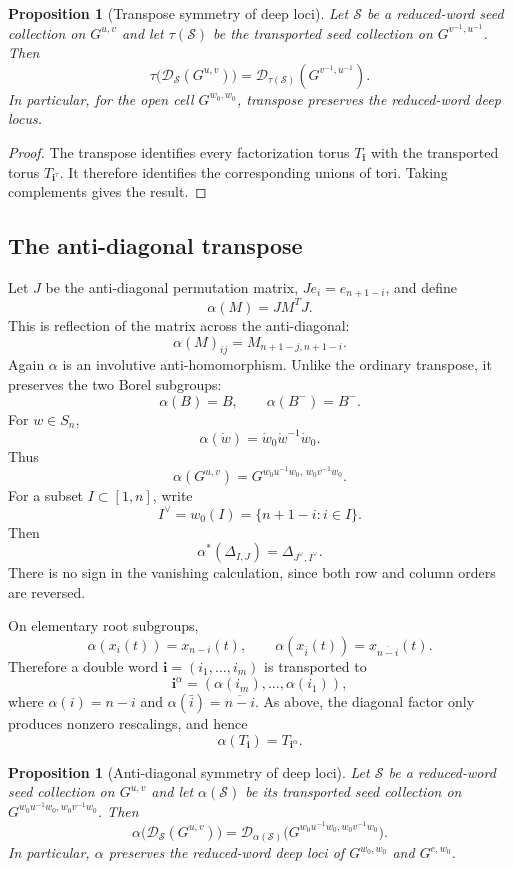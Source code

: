 \documentclass[12pt]{amsart}
\newcommand{\bi}{\mathbf i}
\newcommand{\cS}{\mathcal S}
\newcommand{\cD}{\mathcal D}
\theoremstyle{plain}
\newtheorem{proposition}[theorem]{Proposition}
\theoremstyle{definition}
\theoremstyle{remark}
\begin{document}
\begin{proposition}[Transpose symmetry of deep loci]\label{prop:transpose_symmetry}
Let $\cS$ be a reduced-word seed collection on $G^{u,v}$ and let $\tau(\cS)$ be the transported seed collection on $G^{v^{-1},u^{-1}}$.  Then
\[
   \tau\bigl(\cD_{\cS}(G^{u,v})\bigr)
   =\cD_{\tau(\cS)}(G^{v^{-1},u^{-1}}).
\]
In particular, for the open cell $G^{w_0,w_0}$, transpose preserves the reduced-word deep locus.
\end{proposition}

\begin{proof}
The transpose identifies every factorization torus $T_{\bi}$ with the transported torus $T_{\bi^\tau}$.  It therefore identifies the corresponding unions of tori.  Taking complements gives the result.
\end{proof}

\subsection{The anti-diagonal transpose}

Let $J$ be the anti-diagonal permutation matrix, $Je_i=e_{n+1-i}$, and define
\[
   \alpha(M)=J M^T J.
\]
This is reflection of the matrix across the anti-diagonal:
\[
   \alpha(M)_{ij}=M_{n+1-j,n+1-i}.
\]
Again $\alpha$ is an involutive anti-homomorphism.  Unlike the ordinary transpose, it preserves the two Borel subgroups:
\[
   \alpha(B)=B,
   \qquad
   \alpha(B^-)=B^-.
\]
For $w\in S_n$,
\[
   \alpha(\dot w)=\dot w_0\dot w^{-1}\dot w_0.
\]
Thus
\[
   \alpha(G^{u,v})
   =G^{w_0u^{-1}w_0,\,w_0v^{-1}w_0}.
\]
For a subset $I\subset[1,n]$, write
\[
   I^\vee=w_0(I)=\{n+1-i:i\in I\}.
\]
Then
\[
   \alpha^*(\Delta_{I,J})=\Delta_{J^\vee,I^\vee}.
\]
There is no sign in the vanishing calculation, since both row and column orders are reversed.

On elementary root subgroups,
\[
   \alpha(x_i(t))=x_{n-i}(t),
   \qquad
   \alpha(x_{\bar i}(t))=x_{\overline{n-i}}(t).
\]
Therefore a double word $\bi=(i_1,\ldots,i_m)$ is transported to
\[
   \bi^\alpha=(\alpha(i_m),\ldots,\alpha(i_1)),
\]
where $\alpha(i)=n-i$ and $\alpha(\bar i)=\overline{n-i}$.  As above, the diagonal factor only produces nonzero rescalings, and hence
\[
   \alpha(T_{\bi})=T_{\bi^\alpha}.
\]

\begin{proposition}[Anti-diagonal symmetry of deep loci]\label{prop:anti_diag_symmetry}
Let $\cS$ be a reduced-word seed collection on $G^{u,v}$ and let $\alpha(\cS)$ be its transported seed collection on $G^{w_0u^{-1}w_0,w_0v^{-1}w_0}$.  Then
\[
   \alpha\bigl(\cD_{\cS}(G^{u,v})\bigr)
   =\cD_{\alpha(\cS)}
   \bigl(G^{w_0u^{-1}w_0,w_0v^{-1}w_0}\bigr).
\]
In particular, $\alpha$ preserves the reduced-word deep loci of $G^{w_0,w_0}$ and $G^{e,w_0}$.
\end{proposition}
\end{document}
